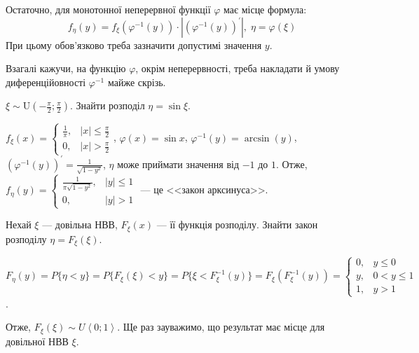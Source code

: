 \noindent Остаточно, для монотонної неперервної функції $\varphi$ має місце формула:
$$f_\eta(y) = f_\xi\left(\varphi^{-1} (y)\right) \cdot \left|\left(\varphi^{-1} (y) \right)^{\prime}\right|, \; \eta = \varphi(\xi)$$
При цьому обов'язково треба зазначити допустимі значення $y$.

\begin{remark}
    Взагалі кажучи, на функцію $\varphi$, окрім неперервності, треба накладати й умову диференційовності $\varphi^{-1}$ майже скрізь. 
\end{remark}

\begin{example}
    $\xi \sim \mathrm{U}(-\frac{\pi}{2}; \frac{\pi}{2})$. Знайти розподіл $\eta = \sin \xi$.

    \noindent $f_\xi(x) = \begin{cases}
        \frac{1}{\pi}, & |x| \leq \frac{\pi}{2} \\
        0, & |x| > \frac{\pi}{2}
    \end{cases}$, $\varphi(x) = \sin x$, $\varphi^{-1} (y) = \arcsin(y)$, $\left(\varphi^{-1} (y)\right)^{\prime} = \frac{1}{\sqrt{1-y^2}}$,
    $\eta$ може приймати значення від $-1$ до $1$. 
    Отже, $f_\eta(y) = \begin{cases}
        \frac{1}{\pi\sqrt{1-y^2}}, & |y| \leq 1 \\
        0, & |y| > 1
    \end{cases}$ --- це <<закон арксинуса>>.
\end{example}

\begin{example}
    Нехай $\xi$ --- довільна НВВ, $F_\xi (x)$ --- її функція розподілу. 
    Знайти закон розподілу $\eta = F_\xi (\xi)$.

    \noindent $F_\eta (y) = P\{\eta < y\} = P\{F_\xi(\xi) < y\} = P\{\xi < F_\xi^{-1}(y)\} = F_\xi(F_\xi^{-1}(y)) = \begin{cases}
        0, & y \leq 0 \\
        y, & 0 < y \leq 1 \\
        1, & y > 1
    \end{cases}$.

    \noindent Отже, $F_\xi (\xi) \sim U\left<0;1\right>$. Ще раз зауважимо, що результат має місце для довільної НВВ $\xi$.
\end{example}

